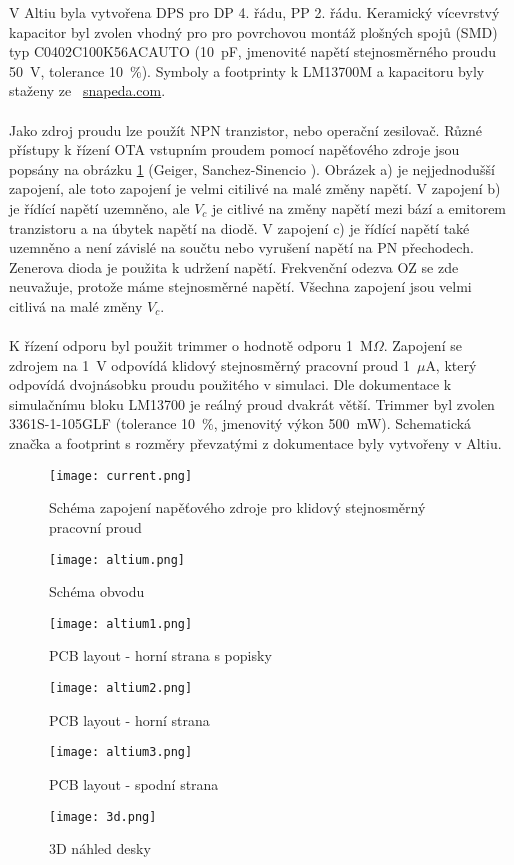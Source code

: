 \noindent V Altiu byla vytvořena DPS pro DP 4. řádu, PP 2. řádu. Keramický vícevrstvý kapacitor byl zvolen vhodný pro pro povrchovou montáž plošných spojů (SMD) typ C0402C100K56ACAUTO (10~pF, jmenovité napětí stejnosměrného proudu 50~V, tolerance 10~\%). Symboly a footprinty k LM13700M a kapacitoru byly staženy ze~ \url{snapeda.com}. \\
\\
Jako zdroj proudu lze použít NPN tranzistor, nebo operační zesilovač. Různé přístupy k řízení OTA vstupním proudem pomocí napěťového zdroje jsou popsány na obrázku \ref{s:DC} (Geiger, Sanchez-Sinencio \cite{25}). Obrázek a) je nejjednodušší zapojení, ale toto zapojení je velmi citilivé na malé změny napětí. V zapojení b) je řídící napětí uzemněno, ale $V_c$ je citlivé na změny napětí mezi bází a emitorem tranzistoru a na úbytek napětí na diodě. V zapojení c) je řídící napětí také uzemněno a není závislé na součtu nebo vyrušení napětí na PN přechodech. Zenerova dioda je použita k udržení napětí. Frekvenční odezva OZ se zde neuvažuje, protože máme stejnosměrné napětí. Všechna zapojení jsou velmi citlivá na malé změny $V_c$. \\
\\
K řízení odporu byl použit trimmer o hodnotě odporu 1~M$\Omega$. Zapojení se zdrojem na 1~V odpovídá klidový stejnosměrný pracovní proud 1~$\mu$A, který odpovídá dvojnásobku proudu použitého v simulaci. Dle dokumentace k simulačnímu bloku LM13700 je reálný proud dvakrát větší. Trimmer byl zvolen 3361S-1-105GLF (tolerance 10~\%, jmenovitý výkon 500~mW). Schematická značka a footprint s rozměry převzatými z dokumentace byly vytvořeny v Altiu.
\begin{figure}[h]
\centering
\texttt{[image: current.png]}
\caption{Schéma zapojení napěťového zdroje pro klidový stejnosměrný pracovní proud \label{s:DC}}
\end{figure}
\begin{figure}[h]
\centering
\texttt{[image: altium.png]}
\caption{Schéma obvodu}
\end{figure}
\begin{figure}[h]
\centering
\texttt{[image: altium1.png]}
\caption{PCB layout - horní strana s popisky}
\end{figure}
\begin{figure}[h]
\centering
\texttt{[image: altium2.png]}
\caption{PCB layout - horní strana}
\end{figure}
\begin{figure}[h]
\centering
\texttt{[image: altium3.png]}
\caption{PCB layout - spodní strana}
\end{figure}
\begin{figure}[h]
\centering
\texttt{[image: 3d.png]}
\caption{3D náhled desky}
\end{figure}